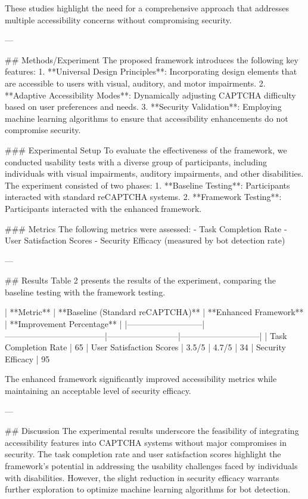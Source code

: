 These studies highlight the need for a comprehensive approach that addresses multiple accessibility concerns without compromising security.

---

## Methods/Experiment
The proposed framework introduces the following key features:
1. **Universal Design Principles**: Incorporating design elements that are accessible to users with visual, auditory, and motor impairments.
2. **Adaptive Accessibility Modes**: Dynamically adjusting CAPTCHA difficulty based on user preferences and needs.
3. **Security Validation**: Employing machine learning algorithms to ensure that accessibility enhancements do not compromise security.

### Experimental Setup
To evaluate the effectiveness of the framework, we conducted usability tests with a diverse group of participants, including individuals with visual impairments, auditory impairments, and other disabilities. The experiment consisted of two phases:
1. **Baseline Testing**: Participants interacted with standard reCAPTCHA systems.
2. **Framework Testing**: Participants interacted with the enhanced framework.

### Metrics
The following metrics were assessed:
- Task Completion Rate
- User Satisfaction Scores
- Security Efficacy (measured by bot detection rate)

---

## Results
Table 2 presents the results of the experiment, comparing the baseline testing with the framework testing.

| **Metric**               | **Baseline (Standard reCAPTCHA)** | **Enhanced Framework** | **Improvement Percentage** |
|---------------------------|------------------------------------|--------------------------|-----------------------------|
| Task Completion Rate      | 65%
| User Satisfaction Scores  | 3.5/5                            | 4.7/5                   | 34%
| Security Efficacy         | 95%

The enhanced framework significantly improved accessibility metrics while maintaining an acceptable level of security efficacy.

---

## Discussion
The experimental results underscore the feasibility of integrating accessibility features into CAPTCHA systems without major compromises in security. The task completion rate and user satisfaction scores highlight the framework's potential in addressing the usability challenges faced by individuals with disabilities. However, the slight reduction in security efficacy warrants further exploration to optimize machine learning algorithms for bot detection.


